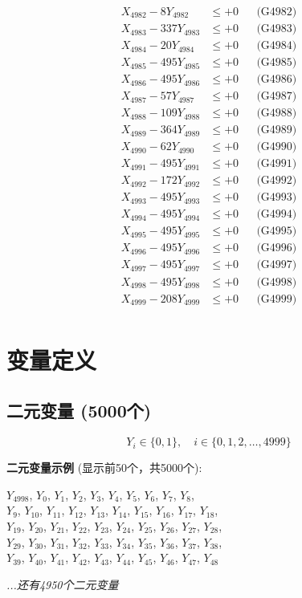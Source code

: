\documentclass[a4paper,10pt]{article}
\begin{document}
{\begin{align}
X_{4982} - 8Y_{4982} &\leq +0 && \text{(G4982)} \\
X_{4983} - 337Y_{4983} &\leq +0 && \text{(G4983)} \\
X_{4984} - 20Y_{4984} &\leq +0 && \text{(G4984)} \\
X_{4985} - 495Y_{4985} &\leq +0 && \text{(G4985)} \\
X_{4986} - 495Y_{4986} &\leq +0 && \text{(G4986)} \\
X_{4987} - 57Y_{4987} &\leq +0 && \text{(G4987)} \\
X_{4988} - 109Y_{4988} &\leq +0 && \text{(G4988)} \\
X_{4989} - 364Y_{4989} &\leq +0 && \text{(G4989)} \\
X_{4990} - 62Y_{4990} &\leq +0 && \text{(G4990)} \\
\allowbreak
X_{4991} - 495Y_{4991} &\leq +0 && \text{(G4991)} \\
X_{4992} - 172Y_{4992} &\leq +0 && \text{(G4992)} \\
X_{4993} - 495Y_{4993} &\leq +0 && \text{(G4993)} \\
X_{4994} - 495Y_{4994} &\leq +0 && \text{(G4994)} \\
X_{4995} - 495Y_{4995} &\leq +0 && \text{(G4995)} \\
X_{4996} - 495Y_{4996} &\leq +0 && \text{(G4996)} \\
X_{4997} - 495Y_{4997} &\leq +0 && \text{(G4997)} \\
X_{4998} - 495Y_{4998} &\leq +0 && \text{(G4998)} \\
X_{4999} - 208Y_{4999} &\leq +0 && \text{(G4999)} \\
\end{align}
}

\section{变量定义}

\subsection{二元变量 (5000个)}

\begin{equation}
Y_i \in \{0,1\}, \quad i \in \{0, 1, 2, \ldots, 4999\}
\end{equation}

\textbf{二元变量示例} (显示前50个，共5000个):

{\small
$Y_{4998}$, $Y_{0}$, $Y_{1}$, $Y_{2}$, $Y_{3}$, $Y_{4}$, $Y_{5}$, $Y_{6}$, $Y_{7}$, $Y_{8}$, \\
$Y_{9}$, $Y_{10}$, $Y_{11}$, $Y_{12}$, $Y_{13}$, $Y_{14}$, $Y_{15}$, $Y_{16}$, $Y_{17}$, $Y_{18}$, \\
$Y_{19}$, $Y_{20}$, $Y_{21}$, $Y_{22}$, $Y_{23}$, $Y_{24}$, $Y_{25}$, $Y_{26}$, $Y_{27}$, $Y_{28}$, \\
$Y_{29}$, $Y_{30}$, $Y_{31}$, $Y_{32}$, $Y_{33}$, $Y_{34}$, $Y_{35}$, $Y_{36}$, $Y_{37}$, $Y_{38}$, \\
$Y_{39}$, $Y_{40}$, $Y_{41}$, $Y_{42}$, $Y_{43}$, $Y_{44}$, $Y_{45}$, $Y_{46}$, $Y_{47}$, $Y_{48}$

\textit{...还有4950个二元变量}
}
\end{document}
